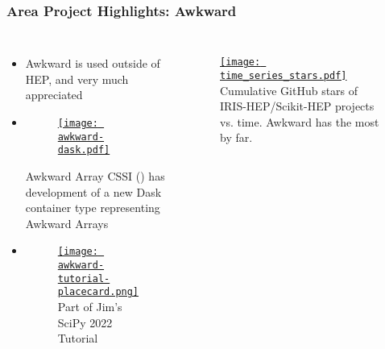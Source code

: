 \begin{frame}
  \frametitle{Area Project Highlights: Awkward}

  \begin{columns}
    \begin{itemize}\setlength{\itemsep}{0.1 cm}
      \item Awkward is used outside of HEP, and very much appreciated
      \item \begin{figure}
        \begin{center}
            \href{https://iris-hep.org/projects/awkward-dask.html}{\texttt{[image: awkward-dask.pdf]}}
        \end{center}
    \end{figure}
   Awkward Array CSSI () has development of a new Dask container type representing Awkward Arrays
      \item
      \begin{figure}
        \begin{center}
            \href{https://github.com/jpivarski-talks/2022-07-11-scipy-loopy-tutorial}{\texttt{[image: awkward-tutorial-placecard.png]}}
            Part of Jim's SciPy 2022 Tutorial
        \end{center}
      \end{figure}
    \end{itemize}
%
    \begin{figure}
        \begin{center}
            \href{https://iris-hep.org/analysis-community-summary/\#stars}{\texttt{[image: time\_series\_stars.pdf]}}
            Cumulative GitHub stars of IRIS-HEP/Scikit-HEP projects vs. time. Awkward has the most by far.
        \end{center}
    \end{figure}
  \end{columns}

\end{frame}

